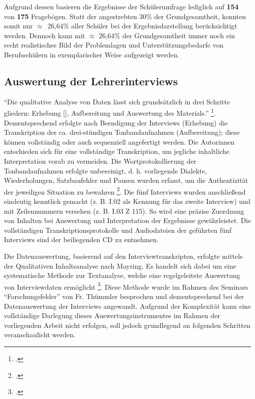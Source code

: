 Aufgrund dessen basieren die Ergebnisse der Schülerumfrage lediglich auf \textbf{154} von \textbf{175} Fragebögen. Statt der angestrebten 30\% der Grundgesamtheit, konnten somit nur \mbox{$\approx$ 26,64\%} aller Schüler bei der Ergebnisdarstellung berücksichtigt werden. Dennoch kann mit $\approx$ 26,64\% der Grundgesamtheit immer noch ein recht realistisches Bild der Problemlagen und Unterstützungsbedarfe von Berufsschülern in exemplarischer Weise aufgezeigt werden.

\subsection{Auswertung der Lehrerinterviews}
\label{sec:AuswertungDerLehrerinterviews}

"`Die qualitative Analyse von Daten lässt sich grundsätzlich in drei Schritte gliedern: Erhebung [\punkte], Aufbereitung und Auswertung des Materials."' \footcite[135]{Krueger2014}. Dementsprechend erfolgte nach Beendigung der Interviews (Erhebung) die Transkription der ca. drei-stündigen Tonbandaufnahmen (Aufbereitung); diese können vollständig oder auch sequenziell angefertigt werden. Die Autorinnen entschieden sich für eine vollständige Transkription, um jegliche inhaltliche Interpretation vorab zu vermeiden. Die Wortprotokollierung der Tonbandaufnahmen erfolgte unbereinigt, d. h. vorliegende Dialekte, Wiederholungen, Satzbaufehler und Pausen wurden erfasst, um die Authentizität der jeweiligen Situation zu bewahren \footcite[vgl.][136]{Krueger2014}. Die fünf Interviews wurden anschließend eindeutig kenntlich gemacht (z. B. I.02 als Kennung für das zweite Interview) und mit Zeilennummern versehen (z. B. I.03 Z 115). So wird eine präzise Zuordnung von Inhalten bei Auswertung und Interpretation der Ergebnisse gewährleistet. Die vollständigen Transkriptionsprotokolle und Audiodateien der geführten fünf Interviews sind der beiliegenden CD zu entnehmen.

Die Datenauswertung, basierend auf den Interviewtranskripten, erfolgte mittels der Qualitativen Inhaltsanalyse nach Mayring. Es handelt sich dabei um eine systematische Methode zur Textanalyse, welche eine regelgeleitete Auswertung von Interviewdaten ermöglicht \footcite[vgl.][133]{Krueger2014}. Diese Methode wurde im Rahmen des Seminars "`Forschungsfelder"' von Fr. Thümmler besprochen und dementsprechend bei der Datenauswertung der Interviews angewandt. Aufgrund der Komplexität kann eine vollständige Darlegung dieses Auswertungsinstrumentes im Rahmen der vorliegenden Arbeit nicht erfolgen, soll jedoch grundlegend an folgenden Schritten veranschaulicht werden.

